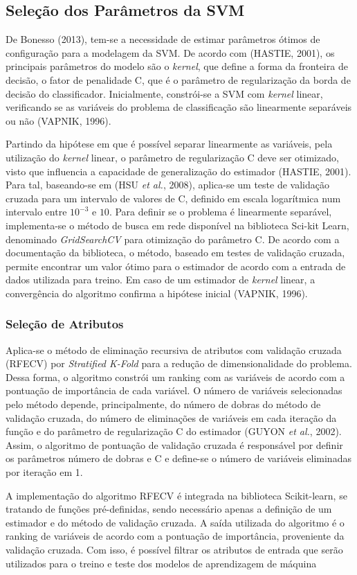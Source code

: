 \documentclass[12pt,oneside,a4paper,chapter=TITLE,section=TITLE,sumario=tradicional,english,brazil]{abntex2}
\begin{document}
\subsection{Seleção dos Parâmetros da SVM}
De Bonesso (2013), tem-se a necessidade de estimar parâmetros ótimos de configuração para a modelagem da SVM. De acordo com (HASTIE, 2001), os principais parâmetros do modelo são o \textit{kernel}, que define a forma da fronteira de decisão, o fator de penalidade C, que é o parâmetro de regularização da borda de decisão do classificador. Inicialmente, constrói-se a SVM com \textit{kernel} linear, verificando se as variáveis do problema de classificação são linearmente separáveis ou não (VAPNIK, 1996). \par
Partindo da hipótese em que é possível separar linearmente as variáveis, pela utilização do \textit{kernel} linear, o parâmetro de regularização C deve ser otimizado, visto que influencia a capacidade de generalização do estimador (HASTIE, 2001). Para tal, baseando-se em (HSU \textit{et al.}, 2008), aplica-se um teste de validação cruzada para um intervalo de valores de C, definido em escala logarítmica num intervalo entre $10^{-3}$ e $10$. 
Para definir se o problema é linearmente separável, implementa-se o método de busca em rede disponível na biblioteca Sci-kit Learn, denominado \textit{GridSearchCV} para otimização do parâmetro C. De acordo com a documentação da biblioteca, o método, baseado em testes de validação cruzada, permite encontrar um valor ótimo para o estimador de acordo com a entrada de dados utilizada para treino. Em caso de um estimador de \textit{kernel} linear, a convergência do algoritmo confirma a hipótese inicial (VAPNIK, 1996).\par 
\subsubsection{Seleção de Atributos}
Aplica-se o método de eliminação recursiva de atributos com validação cruzada (RFECV) por \textit{Stratified K-Fold} para a redução de dimensionalidade do problema. Dessa forma, o algoritmo constrói um ranking com as variáveis de acordo com a pontuação de importância de cada variável. O número de variáveis selecionadas pelo método depende, principalmente, do número de dobras do método de validação cruzada, do número de eliminações de variáveis em cada iteração da função e do parâmetro de regularização C do estimador (GUYON \textit{et al.}, 2002). Assim, o algoritmo de pontuação de validação cruzada é responsável por definir os parâmetros número de dobras e C e define-se o número de variáveis eliminadas por iteração em 1.\par
A implementação do algoritmo RFECV é integrada na biblioteca Scikit-learn, se tratando de funções pré-definidas, sendo necessário apenas a definição de um estimador e do método de validação cruzada. A saída utilizada do algoritmo é o ranking de variáveis de acordo com a pontuação de importância, proveniente da validação cruzada. Com isso, é possível filtrar os atributos de entrada que serão utilizados para o treino e teste dos modelos de aprendizagem de máquina\par 
\end{document}
